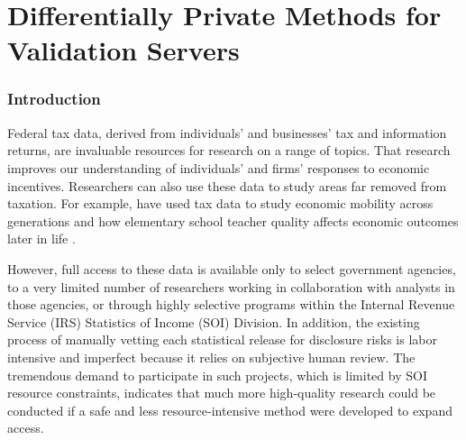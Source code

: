 
\fancyfoot{}


\part{Differentially Private Methods for Validation Servers}
\section{Introduction}\label{sec:intro}

Federal tax data, derived from individuals' and businesses' tax and information returns, are invaluable resources for research on a range of topics. That research improves our understanding of individuals' and firms' responses to economic incentives. Researchers can also use these data to study areas far removed from taxation. For example, \citet{chetty2014measuring} have used tax data to study economic mobility across generations and how elementary school teacher quality affects economic outcomes later in life \citep{chetty2011does}.

However, full access to these data is available only to select government agencies, to a very limited number of researchers working in collaboration with analysts in those agencies, or through highly selective programs within the Internal Revenue Service (IRS) Statistics of Income (SOI) Division. In addition, the existing process of manually vetting each statistical release for disclosure risks is labor intensive and imperfect because it relies on subjective human review. The tremendous demand to participate in such projects, which is limited by SOI resource constraints, indicates that much more high-quality research could be conducted if a safe and less resource-intensive method were developed to expand access.

